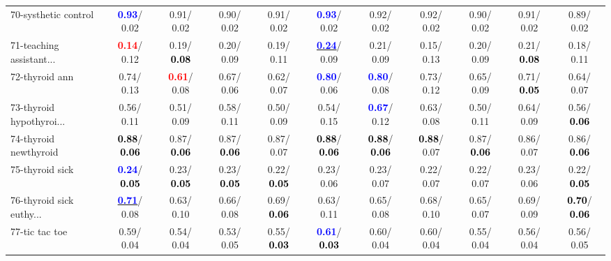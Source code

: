 \begin{table}[h]
\begin{center}
{\begin{tabular}{lc|c|c|c|c|c|c|c|c|c}
70-systhetic control & \textcolor{blue}{\textbf{  0.93}}/  0.02 &   0.91/  0.02 &   0.90/  0.02 &   0.91/  0.02 & \textcolor{blue}{\textbf{  0.93}}/  0.02 &   0.92/  0.02 &   0.92/  0.02 &   0.90/  0.02 &   0.91/  0.02 &   0.89/  0.02 \\
71-teaching assistant... & \textcolor{red}{\textbf{  0.14}}/  0.12 &   0.19/\textcolor{black}{\textbf{  0.08}} &   0.20/  0.09 &   0.19/  0.11 & \underline{\textcolor{blue}{\textbf{  0.24}}}/  0.09 &   0.21/  0.09 &   0.15/  0.13 &   0.20/  0.09 &   0.21/\textcolor{black}{\textbf{  0.08}} &   0.18/  0.11 \\ \hline
72-thyroid ann &   0.74/  0.13 & \textcolor{red}{\textbf{  0.61}}/  0.08 &   0.67/  0.06 &   0.62/  0.07 & \textcolor{blue}{\textbf{  0.80}}/  0.06 & \textcolor{blue}{\textbf{  0.80}}/  0.08 &   0.73/  0.12 &   0.65/  0.09 &   0.71/\textcolor{black}{\textbf{  0.05}} &   0.64/  0.07 \\
73-thyroid hypothyroi... &   0.56/  0.11 &   0.51/  0.09 &   0.58/  0.11 &   0.50/  0.09 &   0.54/  0.15 & \textcolor{blue}{\textbf{  0.67}}/  0.12 &   0.63/  0.08 &   0.50/  0.11 &   0.64/  0.09 &   0.56/\textcolor{black}{\textbf{  0.06}} \\
74-thyroid newthyroid & \textcolor{black}{\textbf{  0.88}}/\textcolor{black}{\textbf{  0.06}} &   0.87/\textcolor{black}{\textbf{  0.06}} &   0.87/\textcolor{black}{\textbf{  0.06}} &   0.87/  0.07 & \textcolor{black}{\textbf{  0.88}}/\textcolor{black}{\textbf{  0.06}} & \textcolor{black}{\textbf{  0.88}}/\textcolor{black}{\textbf{  0.06}} & \textcolor{black}{\textbf{  0.88}}/  0.07 &   0.87/\textcolor{black}{\textbf{  0.06}} &   0.86/  0.07 &   0.86/\textcolor{black}{\textbf{  0.06}} \\
75-thyroid sick & \textcolor{blue}{\textbf{  0.24}}/\textcolor{black}{\textbf{  0.05}} &   0.23/\textcolor{black}{\textbf{  0.05}} &   0.23/\textcolor{black}{\textbf{  0.05}} &   0.22/\textcolor{black}{\textbf{  0.05}} &   0.23/  0.06 &   0.23/  0.07 &   0.22/  0.07 &   0.22/  0.07 &   0.23/  0.06 &   0.22/\textcolor{black}{\textbf{  0.05}} \\
76-thyroid sick euthy... & \underline{\textcolor{blue}{\textbf{  0.71}}}/  0.08 &   0.63/  0.10 &   0.66/  0.08 &   0.69/\textcolor{black}{\textbf{  0.06}} &   0.63/  0.11 &   0.65/  0.08 &   0.68/  0.10 &   0.65/  0.07 &   0.69/  0.09 & \textcolor{black}{\textbf{  0.70}}/\textcolor{black}{\textbf{  0.06}} \\
77-tic tac toe &   0.59/  0.04 &   0.54/  0.04 &   0.53/  0.05 &   0.55/\textcolor{black}{\textbf{  0.03}} & \textcolor{blue}{\textbf{  0.61}}/\textcolor{black}{\textbf{  0.03}} &   0.60/  0.04 &   0.60/  0.04 &   0.55/  0.04 &   0.56/  0.04 &   0.56/  0.05 \\

\end{tabular}}
\end{center}
\end{table}
